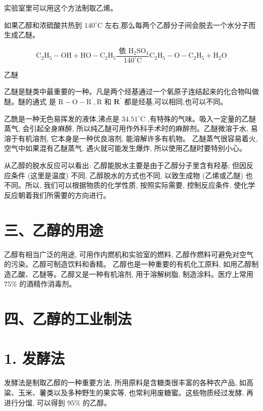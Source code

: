 \documentclass[10pt]{article}
\begin{document}
实验室里可以用这个方法制取乙烯。

如果乙醇和浓硫酸共热到 \({140}^{ \circ }\mathrm{C}\) 左右,那么每两个乙醇分子间会脱去一个水分子而生成乙醚。

\[
{\mathrm{C}}_{2}{\mathrm{H}}_{5} - \mathrm{{OH}} + \mathrm{{HO}} - {\mathrm{C}}_{2}{\mathrm{H}}_{5}\frac{\text{ 依 }{\mathrm{H}}_{2}{\mathrm{{SO}}}_{4}}{{140}^{ \circ }\mathrm{C}}{\mathrm{C}}_{2}{\mathrm{H}}_{5} - \mathrm{O} - {\mathrm{C}}_{2}{\mathrm{H}}_{5} + {\mathrm{H}}_{2}\mathrm{O}
\]

乙醚

乙醚是醚类中最重要的一种。凡是两个烃基通过一个氧原子连结起来的化合物叫做醚。醚的通式 是 \(\mathrm{R} - \mathrm{O} - {\mathrm{R}}^{\prime },\mathrm{R}\) 和 \({\mathbf{R}}^{\prime }\) 都是烃基,可以相同,也可以不同。

乙酰是一种无色易挥发的液体,沸点是 \({34.51}^{ \circ }\mathrm{C}\) ,有特殊的气味。吸入一定量的乙醚蒸气, 会引起全身麻醉, 所以纯乙醚可用作外科手术时的麻醉剂。乙醚微溶于水, 易溶于有机溶剂, 它本身是一种优良溶剂, 能溶解许多有机物。 乙醚蒸气很容易着火, 空气中如果混有乙醚蒸气, 遇火就可能发生爆炸, 所以使用乙醚时要特别小心。

从乙醇的脱水反应可以看出: 乙醇能脱水主要是由于乙醇分子里含有羟基; 但因反应条件 (这里是温度) 不同, 乙醇脱水的方式也不同, 以致生成物 (乙烯或乙醚) 也不同。所以, 我们可以根据物质的化学性质, 按照实际需要, 控制反应条件, 使化学反应朝着我们所需要的方向进行。

\section*{三、乙醇的用途}

乙醇有相当广泛的用途, 可用作内燃机和实验室的燃料, 乙醇作燃料可避免对空气的污染。乙醇可制造饮料和香精。 乙醇也是一种重要的有机化工原料, 如用乙醇制造乙酸、乙醚等。乙醇又是一种有机溶剂, 用于溶解树脂, 制造涂料。医疗上常用 \({75}\%\) 的酒精作消毒剂。

\section*{四、乙醇的工业制法}

\section*{1. 发酵法}

发酵法是制取乙醇的一种重要方法, 所用原料是含糖类很丰富的各种农产品, 如高粱、玉米、薯类以及多种野生的果实等, 也常利用废糖蜜。这些物质经过发酵, 再进行分馏, 可以得到 \({95}\%\) 的乙醇。
\end{document}
